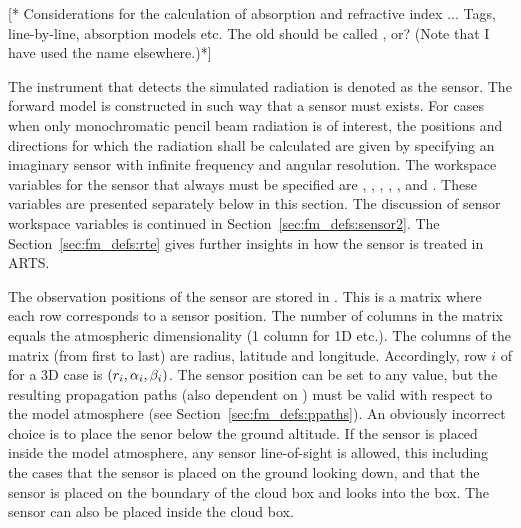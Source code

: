 \label{sec:fm_defs:absorption}

[* Considerations for the calculation of absorption and refractive
index ...  Tags, line-by-line, absorption models etc. The old
 should be called , or? (Note that I
have used the name  elsewhere.)*]



\label{sec:fm_defs:sensor1}

The instrument that detects the simulated radiation is denoted as the
sensor. The forward model is constructed in such
way that a sensor must exists. For cases when only monochromatic
pencil beam radiation is of interest, the positions and directions for
which the radiation shall be calculated are given by specifying an
imaginary sensor with infinite frequency and angular resolution. The
workspace variables for the sensor that always must be specified are
, ,
, ,
,  and
. These variables are presented separately below in this
section. The discussion of sensor workspace variables is continued in
Section~\ref{sec:fm_defs:sensor2}. The Section~\ref{sec:fm_defs:rte}
gives further insights in how the sensor is treated in ARTS.


\label{sec:fm_defs:sensorpos}

The observation positions of the sensor are stored in
. This is a matrix where each row corresponds to a
sensor position. The number of columns in the matrix equals the
atmospheric dimensionality (1 column for 1D etc.). The columns of the
matrix (from first to last) are radius, latitude and longitude.
Accordingly, row $i$ of  for a 3D case is
$(r_{i},\alpha_{i},\beta_{i})$. The sensor position can be set to any
value, but the resulting propagation paths (also dependent on
) must be valid with respect to the model atmosphere
(see Section~\ref{sec:fm_defs:ppaths}). An obviously incorrect choice
is to place the senor below the ground altitude. If the sensor is
placed inside the model atmosphere, any sensor line-of-sight is
allowed, this including the cases that the sensor is placed on the
ground looking down, and that the sensor is placed on the boundary of
the cloud box and looks into the box. The sensor can also be placed
inside the cloud box.

